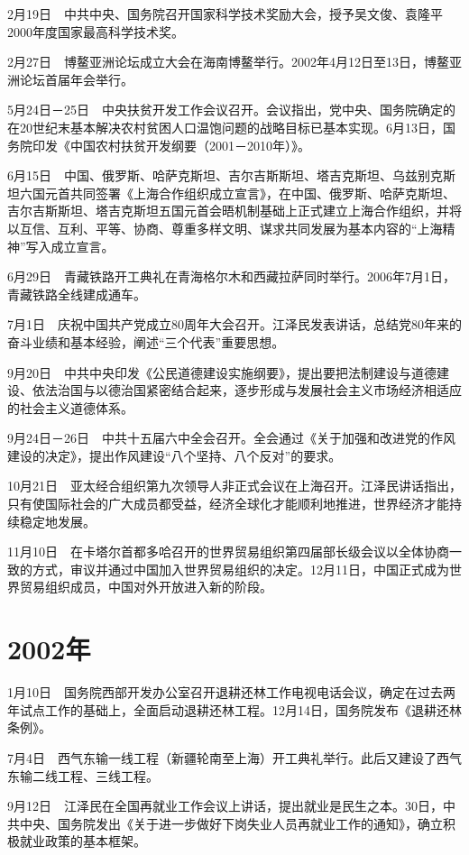 \documentclass[10pt,a4paper,twocolumn]{book}
\begin{document}
2月19日　中共中央、国务院召开国家科学技术奖励大会，授予吴文俊、袁隆平2000年度国家最高科学技术奖。

2月27日　博鳌亚洲论坛成立大会在海南博鳌举行。2002年4月12日至13日，博鳌亚洲论坛首届年会举行。

5月24日－25日　中央扶贫开发工作会议召开。会议指出，党中央、国务院确定的在20世纪末基本解决农村贫困人口温饱问题的战略目标已基本实现。6月13日，国务院印发《中国农村扶贫开发纲要（2001－2010年）》。

6月15日　中国、俄罗斯、哈萨克斯坦、吉尔吉斯斯坦、塔吉克斯坦、乌兹别克斯坦六国元首共同签署《上海合作组织成立宣言》，在中国、俄罗斯、哈萨克斯坦、吉尔吉斯斯坦、塔吉克斯坦五国元首会晤机制基础上正式建立上海合作组织，并将以互信、互利、平等、协商、尊重多样文明、谋求共同发展为基本内容的“上海精神”写入成立宣言。

6月29日　青藏铁路开工典礼在青海格尔木和西藏拉萨同时举行。2006年7月1日，青藏铁路全线建成通车。

7月1日　庆祝中国共产党成立80周年大会召开。江泽民发表讲话，总结党80年来的奋斗业绩和基本经验，阐述“三个代表”重要思想。

9月20日　中共中央印发《公民道德建设实施纲要》，提出要把法制建设与道德建设、依法治国与以德治国紧密结合起来，逐步形成与发展社会主义市场经济相适应的社会主义道德体系。

9月24日－26日　中共十五届六中全会召开。全会通过《关于加强和改进党的作风建设的决定》，提出作风建设“八个坚持、八个反对”的要求。

10月21日　亚太经合组织第九次领导人非正式会议在上海召开。江泽民讲话指出，只有使国际社会的广大成员都受益，经济全球化才能顺利地推进，世界经济才能持续稳定地发展。

11月10日　在卡塔尔首都多哈召开的世界贸易组织第四届部长级会议以全体协商一致的方式，审议并通过中国加入世界贸易组织的决定。12月11日，中国正式成为世界贸易组织成员，中国对外开放进入新的阶段。

\section{2002年}

1月10日　国务院西部开发办公室召开退耕还林工作电视电话会议，确定在过去两年试点工作的基础上，全面启动退耕还林工程。12月14日，国务院发布《退耕还林条例》。

7月4日　西气东输一线工程（新疆轮南至上海）开工典礼举行。此后又建设了西气东输二线工程、三线工程。

9月12日　江泽民在全国再就业工作会议上讲话，提出就业是民生之本。30日，中共中央、国务院发出《关于进一步做好下岗失业人员再就业工作的通知》，确立积极就业政策的基本框架。
\end{document}
